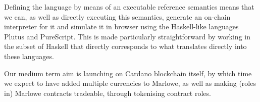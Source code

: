 \documentclass[runningheads]{llncs}
\begin{document}
Defining the language by means of an executable reference semantics means that we can, as well as directly executing this semantics, generate an on-chain interpreter for it and simulate it in browser using the Haskell-like languages Plutus and PureScript. This is made particularly straightforward by working in the subset of Haskell that directly corresponds to what translates directly into these languages.

Our medium term aim is launching on Cardano blockchain itself, by which time we expect to have added multiple currencies to Marlowe, as well as making (roles in) Marlowe contracts tradeable, through tokenising contract roles.


%
%
%


%
\end{document}
